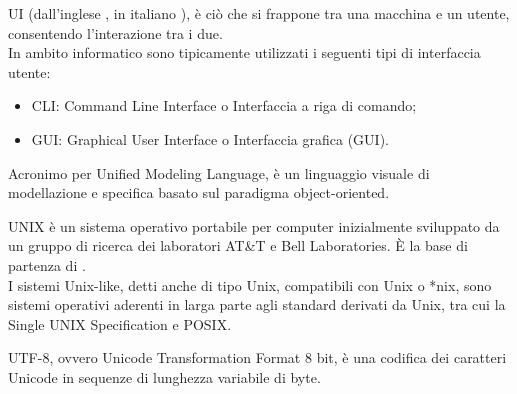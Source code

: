 
UI (dall'inglese , in italiano ), è ciò che si frappone tra una macchina e un utente, consentendo l'interazione tra i due.\\
In ambito informatico sono tipicamente utilizzati i seguenti tipi di interfaccia utente:
\begin{itemize}
  \item CLI: Command Line Interface o Interfaccia a riga di comando;
  \item GUI: Graphical User Interface o Interfaccia grafica (GUI).
\end{itemize}


Acronimo per Unified Modeling Language, è un linguaggio visuale di modellazione e specifica basato sul paradigma object-oriented.

UNIX è un sistema operativo portabile per computer inizialmente sviluppato da un gruppo di ricerca dei laboratori AT\&T e Bell Laboratories. \`{E} la base di partenza di .\\
I sistemi Unix-like, detti anche di tipo Unix, compatibili con Unix o *nix, sono sistemi operativi aderenti in larga parte agli standard derivati da Unix, tra cui la Single UNIX Specification e POSIX.

UTF-8, ovvero Unicode Transformation Format 8 bit, è una codifica dei caratteri Unicode in sequenze di lunghezza variabile di byte.
\clearpage
